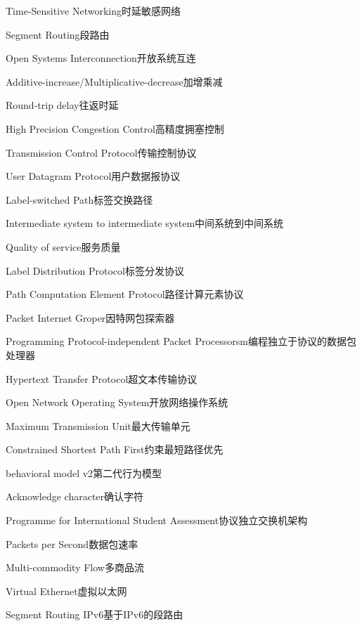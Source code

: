 {Time-Sensitive Networking}{时延敏感网络}

{Segment Routing}{段路由}

{Open Systems Interconnection}{开放系统互连}

{Additive-increase/Multiplicative-decrease}{加增乘减}

{Round-trip delay}{往返时延}

{High Precision Congestion Control}{高精度拥塞控制}

{Transmission Control Protocol}{传输控制协议}

{User Datagram Protocol}{用户数据报协议}

{Label-switched Path}{标签交换路径}

{Intermediate system to intermediate system}{中间系统到中间系统}

{Quality of service}{服务质量}

{Label Distribution Protocol}{标签分发协议}

{Path Computation Element Protocol}{路径计算元素协议}

{Packet Internet Groper}{因特网包探索器}

{Programming Protocol-independent Packet Processorsm}{编程独立于协议的数据包处理器}

{Hypertext Transfer Protocol}{超文本传输协议}

{Open Network Operating System}{开放网络操作系统}

{Maximum Transmission Unit}{最大传输单元}

{Constrained Shortest Path First}{约束最短路径优先}

{behavioral model v2}{第二代行为模型}

{Acknowledge character}{确认字符}

{Programme for International Student Assessment}{协议独立交换机架构}

{Packets per Second}{数据包速率}

{Multi-commodity Flow}{多商品流}

{Virtual Ethernet}{虚拟以太网}

{Segment Routing IPv6}{基于IPv6的段路由}